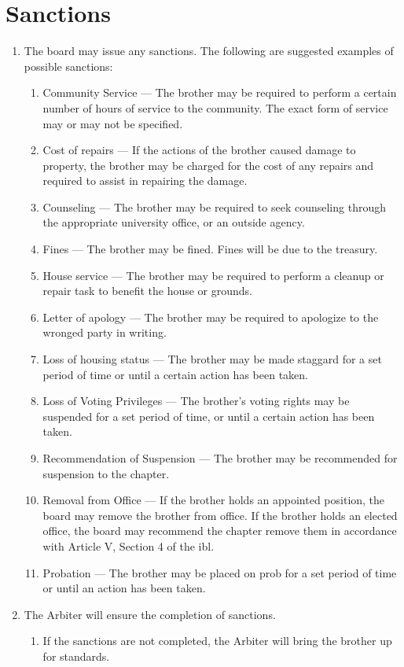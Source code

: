 \section{Sanctions}
	\begin{enumerate}
		\item The board may issue any sanctions.  The following are suggested examples of possible sanctions:
			\begin{enumerate}
				\item Community Service --- The brother may be required to perform a certain number of hours of service to the community.  The exact form of service may or may not be specified.
				\item Cost of repairs --- If the actions of the brother caused damage to property, the brother may be charged for the cost of any repairs and required to assist in repairing the damage.
				\item Counseling --- The brother may be required to seek counseling through the appropriate university office, or an outside agency.
				\item Fines --- The brother may be fined.  Fines will be due to the treasury.
				\item House service --- The brother may be required to perform a cleanup or repair task to benefit the house or grounds.
				\item Letter of apology --- The brother may be required to apologize to the wronged party in writing.
				\item Loss of housing status --- The brother may be made \gls{staggard} for a set period of time or until a certain action has been taken.
				\item Loss of Voting Privileges --- The brother's voting rights may be suspended for a set period of time, or until a certain action has been taken.
				\item Recommendation of Suspension --- The brother may be recommended for suspension to the chapter.
				\item Removal from Office --- If the brother holds an appointed position, the board may remove the brother from office. If the brother holds an elected office, the board may recommend the chapter remove them in accordance with Article V, Section 4 of the \gls{ibl}.
				\item Probation --- The brother may be placed on \gls{prob} for a set period of time or until an action has been taken.
			\end{enumerate}
		\item The Arbiter will ensure the completion of sanctions.
			\begin{enumerate}
				\item If the sanctions are not completed, the Arbiter will bring the brother up for standards.
			\end{enumerate}
	\end{enumerate}

